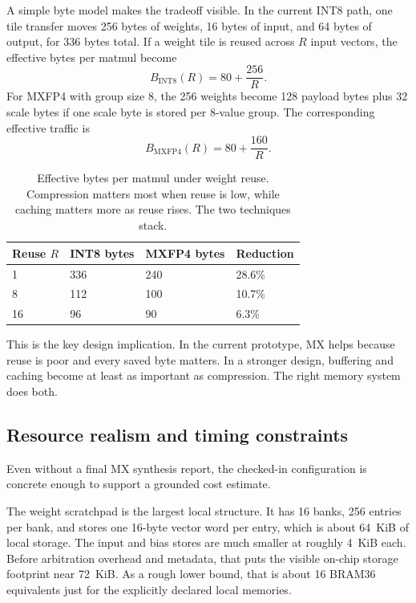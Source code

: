 \documentclass[11pt,a4paper]{article}
\begin{document}
A simple byte model makes the tradeoff visible. In the current INT8 path, one tile transfer moves 256 bytes of weights, 16 bytes of input, and 64 bytes of output, for 336 bytes total. If a weight tile is reused across \(R\) input vectors, the effective bytes per matmul become
\[
B_{\mathrm{INT8}}(R) = 80 + \frac{256}{R}.
\]
For MXFP4 with group size 8, the 256 weights become 128 payload bytes plus 32 scale bytes if one scale byte is stored per 8-value group. The corresponding effective traffic is
\[
B_{\mathrm{MXFP4}}(R) = 80 + \frac{160}{R}.
\]

\begin{table}[h!]
\centering
\small
\begin{tabular}{C{1.6cm}C{2.2cm}C{2.4cm}C{2.4cm}}
\toprule
\textbf{Reuse \(R\)} & \textbf{INT8 bytes} & \textbf{MXFP4 bytes} & \textbf{Reduction} \\
 & 336 & 240 & 28.6\% \\
8 & 112 & 100 & 10.7\% \\
16 & 96 & 90 & 6.3\% \\
\bottomrule
\end{tabular}
\caption{Effective bytes per matmul under weight reuse. Compression matters most when reuse is low, while caching matters more as reuse rises. The two techniques stack.}
\label{tab:reuse-bytes}
\end{table}

This is the key design implication. In the current prototype, MX helps because reuse is poor and every saved byte matters. In a stronger design, buffering and caching become at least as important as compression. The right memory system does both.

\subsection{Resource realism and timing constraints}

Even without a final MX synthesis report, the checked-in configuration is concrete enough to support a grounded cost estimate.

The weight scratchpad is the largest local structure. It has 16 banks, 256 entries per bank, and stores one 16-byte vector word per entry, which is about 64~KiB of local storage. The input and bias stores are much smaller at roughly 4~KiB each. Before arbitration overhead and metadata, that puts the visible on-chip storage footprint near 72~KiB. As a rough lower bound, that is about 16 BRAM36 equivalents just for the explicitly declared local memories.
\end{document}

